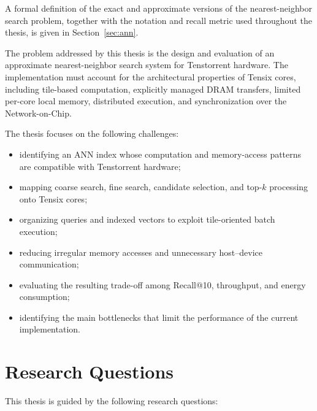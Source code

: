 A formal definition of the exact and approximate versions of the nearest-neighbor search problem, together with the notation and recall metric used throughout the thesis, is given in Section~\ref{sec:ann}.

The problem addressed by this thesis is the design and evaluation of an approximate nearest-neighbor search system for Tenstorrent hardware. The implementation must account for the architectural properties of Tensix cores, including tile-based computation, explicitly managed DRAM transfers, limited per-core local memory, distributed execution, and synchronization over the Network-on-Chip.

The thesis focuses on the following challenges:

\begin{itemize}
\item identifying an ANN index whose computation and memory-access patterns are compatible with Tenstorrent hardware;
\item mapping coarse search, fine search, candidate selection, and top-\(k\) processing onto Tensix cores;
\item organizing queries and indexed vectors to exploit tile-oriented batch execution;
\item reducing irregular memory accesses and unnecessary host--device communication;
\item evaluating the resulting trade-off among Recall@10, throughput, and energy consumption;
\item identifying the main bottlenecks that limit the performance of the current implementation.
\end{itemize}

\section{Research Questions}

This thesis is guided by the following research questions:

